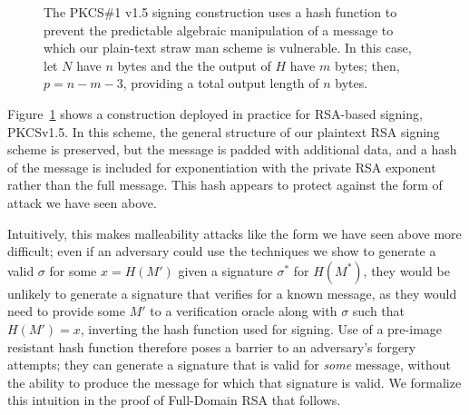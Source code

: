 \begin{figure}[h]
\centering
{}

  \caption{The PKCS\#1 v1.5 signing construction uses a hash function to prevent the predictable algebraic manipulation of a message to which our plain-text straw man scheme is vulnerable.  In this case, let $N$ have $n$ bytes and the the output of $H$ have $m$ bytes; then, $p=n - m - 3$, providing a total output length of $n$ bytes.}
\label{fig:pkcs15sign}
\end{figure}



Figure~\ref{fig:pkcs15sign} shows a construction deployed in practice for RSA-based signing, PKCSv1.5.  In this scheme, the general structure of our plaintext RSA signing scheme is preserved, but the message is padded with additional data, and a hash of the message is included for exponentiation with the private RSA exponent rather than the full message.  This hash appears to protect against the form of attack we have seen above.

Intuitively, this makes malleability attacks like the form we have seen above more difficult; even if an adversary could use the techniques we show to generate a valid $\sigma$ for some $x=H(M')$ given a signature $\sigma^*$ for $H(M^*)$, they would be unlikely to generate a signature that verifies for a known message, as they would need to provide some $M'$ to a verification oracle along with $\sigma$ such that $H(M')=x$, inverting the hash function used for signing.  Use of a pre-image resistant hash function therefore poses a barrier to an adversary's forgery attempts; they can generate a signature that is valid for \emph{some} message, without the ability to produce the message for which that signature is valid.  We formalize this intuition in the proof of Full-Domain RSA that follows.

